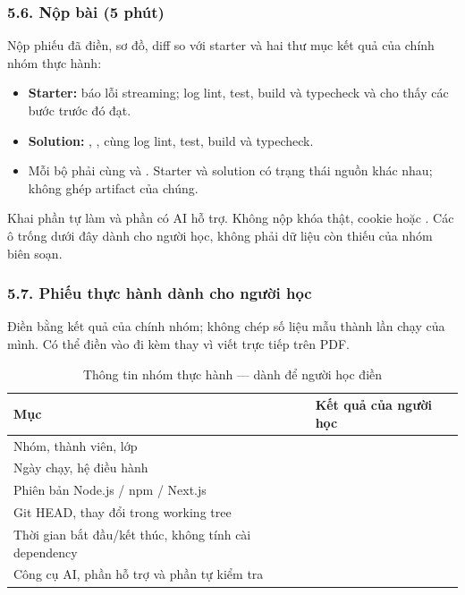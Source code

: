 \documentclass[12pt,a4paper]{extarticle}
\begin{document}
\subsubsection*{5.6. Nộp bài (5 phút)}
Nộp phiếu đã điền, sơ đồ, diff so với starter và hai thư mục kết quả của chính nhóm thực hành:
\begin{itemize}[noitemsep]
    \item \textbf{Starter:}  báo lỗi streaming; log lint, test, build và typecheck và  cho thấy các bước trước đó đạt.
    \item \textbf{Solution:} , ,  cùng log lint, test, build và typecheck.
    \item Mỗi bộ phải cùng  và . Starter và solution có trạng thái nguồn khác nhau; không ghép artifact của chúng.
\end{itemize}
Khai phần tự làm và phần có AI hỗ trợ. Không nộp khóa thật, cookie hoặc . Các ô trống dưới đây dành cho người học, không phải dữ liệu còn thiếu của nhóm biên soạn.

\subsubsection*{5.7. Phiếu thực hành dành cho người học}
Điền bằng kết quả của chính nhóm; không chép số liệu mẫu thành lần chạy của mình. Có thể điền vào  đi kèm thay vì viết trực tiếp trên PDF.

\begin{table}[H]
\centering\small
\caption{Thông tin nhóm thực hành — dành để người học điền}
\begin{tabularx}{\textwidth}{>{\raggedright\arraybackslash}p{7.0cm}X}
\toprule\textbf{Mục} & \textbf{Kết quả của người học} \\
\midrule
Nhóm, thành viên, lớp & \rule{0pt}{1.8em} \\
Ngày chạy, hệ điều hành & \rule{0pt}{1.8em} \\
Phiên bản Node.js / npm / Next.js & \rule{0pt}{1.8em} \\
Git HEAD, thay đổi trong working tree & \rule{0pt}{1.8em} \\
Thời gian bắt đầu/kết thúc, không tính cài dependency & \rule{0pt}{1.8em} \\
Công cụ AI, phần hỗ trợ và phần tự kiểm tra & \rule{0pt}{1.8em} \\
\bottomrule
\end{tabularx}
\end{table}
\end{document}

